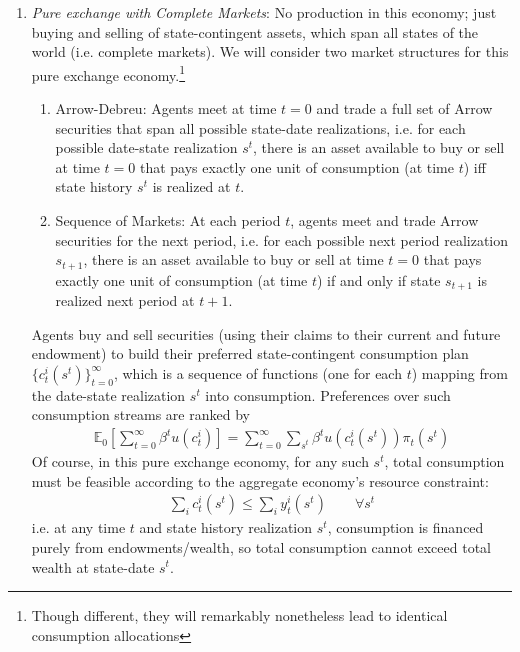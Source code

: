 \documentclass[12pt]{article}
\theoremstyle{plain}
\theoremstyle{definition}
\theoremstyle{remark}
\newcommand{\E}{\mathbb{E}}
\newcommand{\sumtinfz}{\sum^\infty_{t=0}}
\newcommand{\tinfz}{^\infty_{t=0}}
\begin{document}
\begin{enumerate}
  \item \emph{Pure exchange with Complete Markets}:
    No production in this economy;
    just buying and selling of state-contingent assets, which
    span all states of the world (i.e. complete markets).
    We will consider two market structures for this pure exchange
    economy.\footnote{%
      Though different, they will remarkably nonetheless lead to
      identical consumption allocations
    }
    \begin{enumerate}
      \item Arrow-Debreu:
        Agents meet at time $t=0$ and trade a full set of Arrow
        securities that span all possible state-date realizations,
        i.e. for each possible date-state realization $s^t$, there is an
        asset available to buy or sell at time $t=0$ that pays exactly
        one unit of consumption (at time $t$) iff state history $s^t$ is
        realized at $t$.
      \item Sequence of Markets:
        At each period $t$, agents meet and trade Arrow securities for
        the next period, i.e. for each possible next period realization
        $s_{t+1}$, there is an asset available to buy or sell at time
        $t=0$ that pays exactly one unit of consumption (at time $t$) if
        and only if state $s_{t+1}$ is realized next period at $t+1$.
    \end{enumerate}
    Agents buy and sell securities (using their claims to their
    current and future endowment) to build their preferred
    state-contingent consumption plan $\{c_t^i(s^t)\}\tinfz$, which is a
    sequence of functions (one for each $t$) mapping from the date-state
    realization $s^t$ into consumption.
    Preferences over such consumption streams are ranked by
    \begin{align}
      \E_0\left[
      \sumtinfz \beta^t
        u(c_t^i)
      \right]
      =
      \sumtinfz
        \sum_{s^t}
        \beta^t
        u\left(c_t^i(s^t)\right)\pi_t(s^t)
      \label{ad:objfcn}
    \end{align}
    Of course, in this pure exchange economy, for any such $s^t$, total
    consumption must be feasible according to the aggregate economy's
    resource constraint:
    \begin{align*}
      \sum_i c_t^i(s^t) \leq \sum_i y_t^i(s^t)
      \qquad \forall s^t
    \end{align*}
    i.e. at any time $t$ and state history realization $s^t$,
    consumption is financed purely from endowments/wealth, so total
    consumption cannot exceed total wealth at state-date $s^t$.
\end{enumerate}
\end{document}

